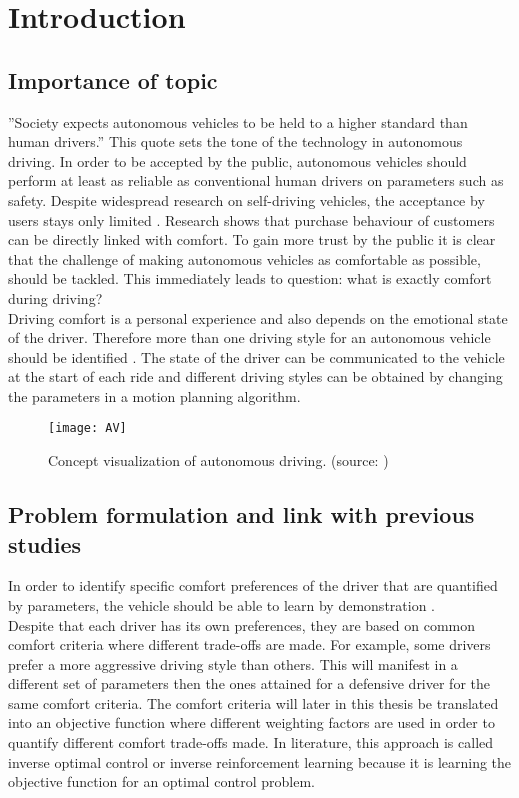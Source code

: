 \chapter{Introduction}
\label{cha:intro}
\section{Importance of topic} \label{s:importance_topic}
''Society expects autonomous vehicles to be held to a higher standard than human drivers.'' \cite{Prof.Amnon} This quote sets the tone of the technology in autonomous driving. In order to be accepted by the public, autonomous vehicles should perform at least as reliable as conventional human drivers on parameters such as safety. Despite widespread research on self-driving vehicles, the acceptance by users stays only limited \cite{Bae2019}. Research shows that purchase behaviour of customers can be directly linked with comfort. To gain more trust by the public it is clear that the challenge of making autonomous vehicles as comfortable as possible, should be tackled. This immediately leads to question: what is exactly comfort during driving?\\
Driving comfort is a personal experience and also depends on the emotional state of the driver. Therefore more than one driving style for an autonomous vehicle should be identified \cite{Eindhoven2019}. The state of the driver can be communicated to the vehicle at the start of each ride and different driving styles can be obtained by changing the parameters in a motion planning algorithm. 

\begin{figure}[h!]
	\centering
	\texttt{[image: AV]}
	\caption{Concept visualization of autonomous driving. (source: \cite{AV})}
	\label{fig:AV}
\end{figure} 
\newpage

\section{Problem formulation and link with previous studies}
In order to identify specific comfort preferences of the driver that are quantified by parameters, the vehicle should be able to learn by demonstration \cite{Kuderer2015a}.\\
Despite that each driver has its own preferences, they are based on common comfort criteria where different trade-offs are made. For example, some drivers prefer a more aggressive driving style than others. This will manifest in a different set of parameters then the ones attained for a defensive driver for the same comfort criteria. The comfort criteria will later in this thesis be translated into an objective function where different weighting factors are used in order to quantify different comfort trade-offs made. In literature, this approach is called inverse optimal control or inverse reinforcement learning because it is learning the objective function for an optimal control problem.\\

